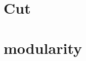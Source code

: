 \documentclass[•]{article}
\begin{document}
\section{Cut}

%
%
%
%
%

\section{modularity}

%

%






%
\end{document}
